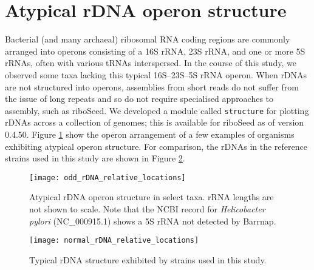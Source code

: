 \section*{Atypical rDNA operon structure}

Bacterial (and many archaeal) ribosomal RNA coding regions are commonly arranged into operons consisting of a 16S rRNA, 23S rRNA, and one or more 5S rRNAs, often with various tRNAs interspersed. In the course of this study, we observed some taxa lacking this typical 16S--23S--5S rRNA operon. When rDNAs are not structured into operons, assemblies from short reads do not suffer from the issue of long repeats and so do not require specialised approaches to assembly, such as riboSeed. We developed a module called \texttt{structure} for plotting rDNAs across a collection of genomes; this is available for riboSeed as of version 0.4.50.  Figure \ref{fig:atypical} show the operon arrangement of a few examples of organisms exhibiting atypical operon structure. For comparison, the rDNAs in the reference strains used in this study are shown in Figure \ref{fig:typical}.

\begin{figure}[H]
  \centering
  \hspace*{0cm}\texttt{[image: odd\_rDNA\_relative\_locations]}
  \caption{Atypical rDNA operon structure in select taxa. rRNA lengths are not shown to scale. Note that the NCBI record for \textit{Helicobacter pylori} (NC\_000915.1) shows a 5S rRNA not detected by Barrnap. }
  \label{fig:atypical}
\end{figure}

\begin{figure}[H]
  \centering
  \hspace*{0cm}\texttt{[image: normal\_rDNA\_relative\_locations]}
  \caption{Typical rDNA structure exhibited by strains used in this study.}
  \label{fig:typical}
\end{figure}
